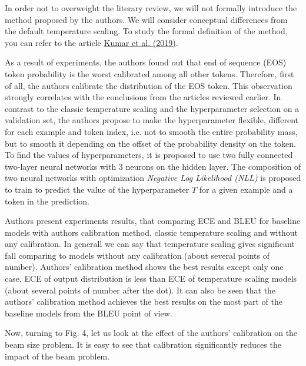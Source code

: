 \documentclass[a4paper,14pt]{extarticle}
\newcommand{\bibref}[3]{\hyperlink{#1}{#2 (#3)}}
\begin{document}
	In order not to overweight the literary review, we will not formally introduce the method proposed by the authors. We will consider conceptual differences from the default temperature scaling. To study the formal definition of the method, you can refer to the article \bibref{calibration}{Kumar et al.}{2019}.
	
	As a result of experiments, the authors found out that end of sequence (EOS) token probability is the worst calibrated among all other tokens. Therefore, first of all, the authors calibrate the distribution of the EOS token. This observation strongly correlates with the conclusions from the articles reviewed earlier. In contrast to the classic temperature scaling and the hyperparameter selection on a validation set, the authors propose to make the hyperparameter flexible, different for each example and token index, i.e. not to smooth the entire probability mass, but to smooth it depending on the offset of the probability density on the token. To find the values of hyperparameters, it is proposed to use two fully connected two-layer neural networks with 3 neurons on the hidden layer. The composition of two neural networks with optimization \textit{Negative Log Likelihood (NLL)} is proposed to train to predict the value of the hyperparameter $T$ for a given example and a token in the prediction.
	
	Authors present experiments results, that comparing ECE and BLEU for baseline models with authors calibration method, classic temperature scaling and without any calibration. In generall we can say that temperature scaling gives significant fall comparing to models without any calibration (about several points of number). Authors' calibration method shows the best results except only one case, ECE of output distribution is less than ECE of temperature scaling models (about several points of number after the dot). It can also be seen that the authors' calibration method achieves the best results on the most part of the baseline models from the BLEU point of view.
	
	Now, turning to Fig. 4, let us look at the effect of the authors' calibration on the beam size problem. It is easy to see that calibration significantly reduces the impact of the beam problem.
	
	\begin{figure}[t]
	\end{figure}
	
\end{document}
